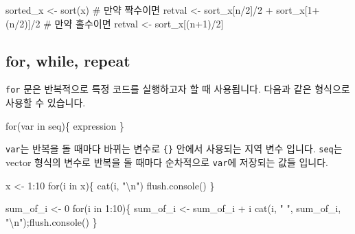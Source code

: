 \documentclass[
  a4paper,
]{book}
\newenvironment{Shaded}{\begin{snugshade}}{\end{snugshade}}
\newcommand{\CommentTok}[1]{\textcolor[rgb]{0.37,0.37,0.37}{#1}}
\newcommand{\ControlFlowTok}[1]{\textcolor[rgb]{0.00,0.23,0.31}{#1}}
\newcommand{\DecValTok}[1]{\textcolor[rgb]{0.68,0.00,0.00}{#1}}
\newcommand{\FunctionTok}[1]{\textcolor[rgb]{0.28,0.35,0.67}{#1}}
\newcommand{\NormalTok}[1]{\textcolor[rgb]{0.00,0.23,0.31}{#1}}
\newcommand{\OtherTok}[1]{\textcolor[rgb]{0.00,0.23,0.31}{#1}}
\newcommand{\SpecialCharTok}[1]{\textcolor[rgb]{0.37,0.37,0.37}{#1}}
\newcommand{\StringTok}[1]{\textcolor[rgb]{0.13,0.47,0.30}{#1}}
\begin{document}
\begin{Shaded}
\begin{Highlighting}[]
\NormalTok{sorted\_x }\OtherTok{\textless{}{-}} \FunctionTok{sort}\NormalTok{(x)}
\CommentTok{\# 만약 짝수이면 }
\NormalTok{retval }\OtherTok{\textless{}{-}}\NormalTok{ sort\_x[n}\SpecialCharTok{/}\DecValTok{2}\NormalTok{]}\SpecialCharTok{/}\DecValTok{2} \SpecialCharTok{+}\NormalTok{ sort\_x[}\DecValTok{1}\SpecialCharTok{+}\NormalTok{(n}\SpecialCharTok{/}\DecValTok{2}\NormalTok{)]}\SpecialCharTok{/}\DecValTok{2}
\CommentTok{\# 만약 홀수이면 }
\NormalTok{retval }\OtherTok{\textless{}{-}}\NormalTok{ sort\_x[(n}\SpecialCharTok{+}\DecValTok{1}\NormalTok{)}\SpecialCharTok{/}\DecValTok{2}\NormalTok{]}
\end{Highlighting}
\end{Shaded}

\hypertarget{for-while-repeat}{%
\subsection{for, while, repeat}\label{for-while-repeat}}

\texttt{for} 문은 반복적으로 특정 코드를 실행하고자 할 때 사용됩니다.
다음과 같은 형식으로 사용할 수 있습니다.

\begin{Shaded}
\begin{Highlighting}[]
\ControlFlowTok{for}\NormalTok{(var }\ControlFlowTok{in}\NormalTok{ seq)\{}
\NormalTok{  expression}
\NormalTok{\}}
\end{Highlighting}
\end{Shaded}

\texttt{var}는 반복을 돌 때마다 바뀌는 변수로 \texttt{\{\}} 안에서
사용되는 지역 변수 입니다. \texttt{seq}는 vector 형식의 변수로 반복을 돌
때마다 순차적으로 \texttt{var}에 저장되는 값들 입니다.

\begin{Shaded}
\begin{Highlighting}[]
\NormalTok{x }\OtherTok{\textless{}{-}} \DecValTok{1}\SpecialCharTok{:}\DecValTok{10}
\ControlFlowTok{for}\NormalTok{(i }\ControlFlowTok{in}\NormalTok{ x)\{}
  \FunctionTok{cat}\NormalTok{(i, }\StringTok{"}\SpecialCharTok{\textbackslash{}n}\StringTok{"}\NormalTok{)}
  \FunctionTok{flush.console}\NormalTok{()}
\NormalTok{\}}

\NormalTok{sum\_of\_i }\OtherTok{\textless{}{-}} \DecValTok{0}
\ControlFlowTok{for}\NormalTok{(i }\ControlFlowTok{in} \DecValTok{1}\SpecialCharTok{:}\DecValTok{10}\NormalTok{)\{}
\NormalTok{  sum\_of\_i }\OtherTok{\textless{}{-}}\NormalTok{ sum\_of\_i }\SpecialCharTok{+}\NormalTok{ i}
  \FunctionTok{cat}\NormalTok{(i, }\StringTok{" "}\NormalTok{, sum\_of\_i, }\StringTok{"}\SpecialCharTok{\textbackslash{}n}\StringTok{"}\NormalTok{);}\FunctionTok{flush.console}\NormalTok{()}
\NormalTok{\}}
\end{Highlighting}
\end{Shaded}
\end{document}
